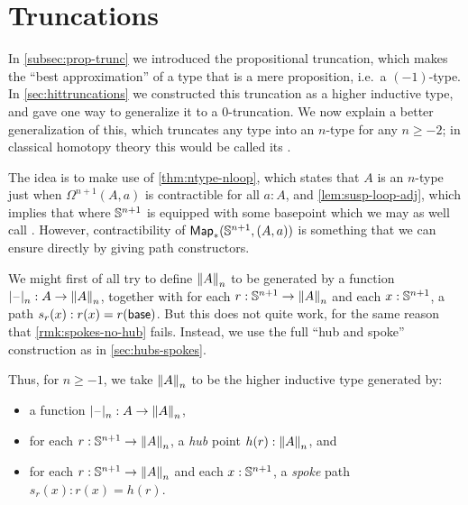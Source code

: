 \section{Truncations}
\label{sec:truncations}

%
%

In \autoref{subsec:prop-trunc} we introduced the propositional truncation, which makes the ``best approximation'' of a type that is a mere
proposition, i.e.\ a $(-1)$-type.
In \autoref{sec:hittruncations} we constructed this truncation as a higher inductive type, and gave one way to generalize it to a
0-truncation.
We now explain a better generalization of this, which truncates any type into an $n$-type for any $n\geq -2$; in classical homotopy theory this would be called its .

The idea is to make use of \autoref{thm:ntype-nloop}, which states that $A$ is an $n$-type just when $\Omega^{n+1}(A,a)$
%
is contractible for
all $a:A$, and \autoref{lem:susp-loop-adj}, which implies that
 where $\Sn^{n+1}$ is equipp\-ed with some basepoint which we may as well call \base.
However, contractibility of $\Map_*(\Sn^{n+1},(A,a))$ is something that we can ensure directly by giving path constructors.

We might first of all try to define $\trunc nA$ to be generated by a function $\tprojf n : A \to \trunc n A$, together with for each
$r:\Sn^{n+1} \to \trunc n A$ and each $x:\Sn^{n+1}$, a path $s_r(x):r(x) = r(\base)$.
%
But this does not quite work, for the same reason that \autoref{rmk:spokes-no-hub} fails.
%
Instead, we use the full ``hub and spoke'' construction as in \autoref{sec:hubs-spokes}.

Thus, for $n\ge -1$, we take $\trunc nA$ to be the higher inductive type generated by:
\begin{itemize}
\item a function $\tprojf n : A \to \trunc n A$,
\item for each $r:\Sn^{n+1} \to \trunc n A$, a \emph{hub} point $h(r):\trunc n A$, and
\item for each $r:\Sn^{n+1} \to \trunc n A$ and each $x:\Sn^{n+1}$, a \emph{spoke} path $s_r(x):r(x) = h(r)$.
\end{itemize}


